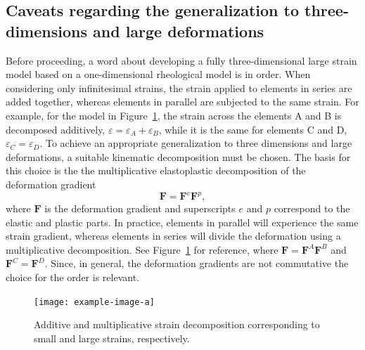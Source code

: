
\subsection{Caveats regarding the generalization to three-dimensions and large deformations}
\label{sec:generalization_large_strains_3d}

Before proceeding, a word about developing a fully three-dimensional large strain model based on a one-dimensional rheological model is in order.
When considering only infinitesimal strains, the strain applied to elements in series are added together, whereas elements in parallel are subjected to the same strain.
For example, for the model in Figure~\ref{fig:gradient_decomp}, the strain across the elements A and B is decomposed additively, $\varepsilon = \varepsilon_A + \varepsilon_B$, while it is the same for elements C and D, $\varepsilon_C = \varepsilon_D$.
To achieve an appropriate generalization to three dimensions and large deformations, a suitable kinematic decomposition must be chosen.
The basis for this choice is the the multiplicative elastoplastic decomposition of the deformation gradient \citep{desouzanetoComputationalMethodsPlasticity2008}
\begin{equation}
	\label{eq:mult_gradient_decomp}
\mathbf F = \mathbf F^e \mathbf F^p,
\end{equation}
where $\mathbf F$ is the deformation gradient and superscripts $e$ and $p$ correspond to the elastic and plastic parts.
In practice, elements in parallel will experience the same strain gradient, whereas elements in series will divide the deformation using a multiplicative decomposition.
See Figure~\ref{fig:gradient_decomp} for reference, where $\mathbf F = \mathbf F^A \mathbf F^B$ and $\mathbf F^C = \mathbf F^D$.
Since, in general, the deformation gradients are not commutative the choice for the order is relevant.
\begin{figure}
	\centering
	\texttt{[image: example-image-a]}
	\caption{Additive and multiplicative strain decomposition corresponding to small and large strains, respectively.}
\label{fig:gradient_decomp}
\end{figure}

